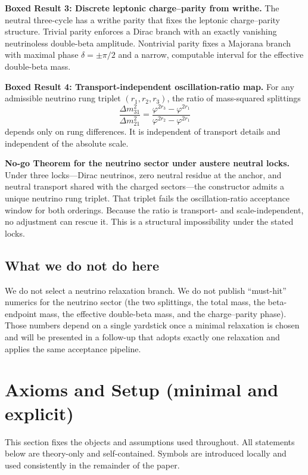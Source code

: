 \documentclass[11pt]{article}
\begin{document}
\textbf{Boxed Result 3: Discrete leptonic charge--parity from writhe.} The neutral three-cycle has a writhe parity that fixes the leptonic charge--parity structure. Trivial parity enforces a Dirac branch with an exactly vanishing neutrinoless double-beta amplitude. Nontrivial parity fixes a Majorana branch with maximal phase $\delta=\pm\pi/2$ and a narrow, computable interval for the effective double-beta mass.

\textbf{Boxed Result 4: Transport-independent oscillation-ratio map.} For any admissible neutrino rung triplet $(r_1,r_2,r_3)$, the ratio of mass-squared splittings
\[
\frac{\Delta m^2_{31}}{\Delta m^2_{21}}=\frac{\varphi^{2r_3}-\varphi^{2r_1}}{\varphi^{2r_2}-\varphi^{2r_1}}
\]
depends only on rung differences. It is independent of transport details and independent of the absolute scale.

\textbf{No-go Theorem for the neutrino sector under austere neutral locks.} Under three locks---Dirac neutrinos, zero neutral residue at the anchor, and neutral transport shared with the charged sectors---the constructor admits a unique neutrino rung triplet. That triplet fails the oscillation-ratio acceptance window for both orderings. Because the ratio is transport- and scale-independent, no adjustment can rescue it. This is a structural impossibility under the stated locks.

\subsection*{What we do not do here}

We do not select a neutrino relaxation branch. We do not publish ``must-hit'' numerics for the neutrino sector (the two splittings, the total mass, the beta-endpoint mass, the effective double-beta mass, and the charge--parity phase). Those numbers depend on a single yardstick once a minimal relaxation is chosen and will be presented in a follow-up that adopts exactly one relaxation and applies the same acceptance pipeline.

\section{Axioms and Setup (minimal and explicit)}

This section fixes the objects and assumptions used throughout. All statements below are theory-only and self-contained. Symbols are introduced locally and used consistently in the remainder of the paper.
\end{document}
